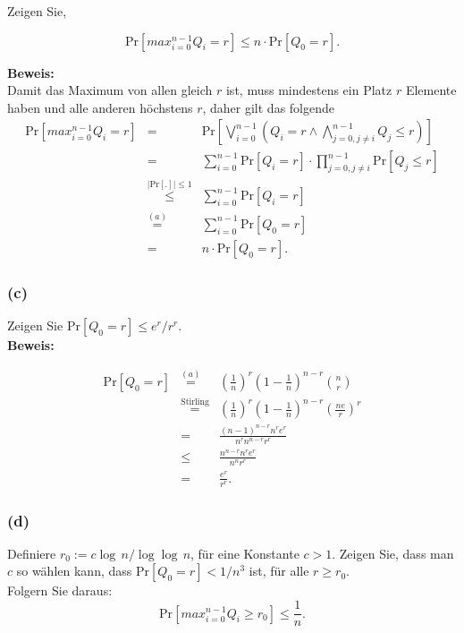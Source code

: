 \documentclass[11pt,a4paper,ngerman]{article}
\newcommand{\prob}[1]{\text{Pr}\left[ #1 \right]}
\begin{document}
Zeigen Sie,

$$
	\prob{max_{i=0}^{n-1} Q_i = r} \leq n \cdot \prob{Q_0 = r}.
$$

\noindent\textbf{Beweis:}\\
Damit das Maximum von allen gleich $r$ ist, muss mindestens ein Platz $r$ Elemente haben und alle anderen höchstens $r$, daher gilt das folgende
$$\begin{array}{rcl}
	\prob{max_{i=0}^{n-1} Q_i = r} &=& \prob{\bigvee_{i=0}^{n-1} \left( Q_i = r \wedge \bigwedge_{j=0, j \not= i}^{n-1} Q_j \leq r \right)}\\
		&=& \sum_{i=0}^{n-1} \prob{Q_i = r} \cdot \prod_{j=0, j \not= i}^{n-1} \prob{Q_j \leq r}\\
		&\stackrel{|\prob{.}|\leq 1}{\leq} & \sum_{i=0}^{n-1} \prob{Q_i = r}\\
		&\stackrel{(a)}{=}& \sum_{i=0}^{n-1} \prob{Q_0 = r}\\
		&=& n \cdot \prob{Q_0 = r}.
\end{array}$$

\subsubsection*{(c)}

Zeigen Sie $\prob{Q_0 = r} \leq e^r / r^r$.\\

\noindent\textbf{Beweis:}

$$\begin{array}{rcl}
	\prob{Q_0 = r} &\stackrel{(a)}{=}&  \left(\frac{1}{n} \right)^r \left( 1 - \frac{1}{n}\right)^{n-r} \binom{n}{r}\\
		&\stackrel{\text{Stirling}}{=}&  \left(\frac{1}{n} \right)^r \left( 1 - \frac{1}{n}\right)^{n-r} \left( \frac{ne}{r} \right)^r\\
		&=& \frac{(n-1)^{n-r}n^re^r}{n^r n^{n-r} r^r}\\
		&\leq& \frac{n^{n-r}n^re^r}{n^nr^r}\\
		&=& \frac{e^r}{r^r}.
\end{array}$$

\subsubsection*{(d)}

Definiere $r_0 := c \log \, n / \log \log \, n$, für eine Konstante $c > 1$. Zeigen Sie, dass man $c$ so wählen kann, dass $\prob{Q_0 = r} < 1 / n^3$ ist, für alle $r \geq r_0$.\\
Folgern Sie daraus:
$$
	\prob{max_{i=0}^{n-1} Q_i \geq r_0} \leq \frac{1}{n}.
$$
\end{document}
